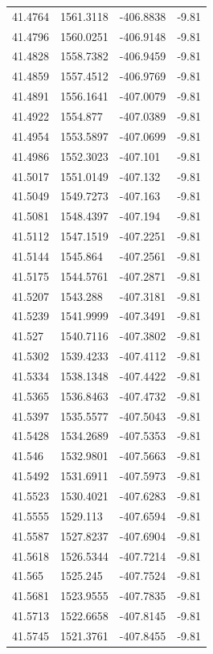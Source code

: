 \begin{table}[H]
\begin{tabular}{llll}
41.4764 & 1561.3118 & -406.8838 & -9.81 \\
41.4796 & 1560.0251 & -406.9148 & -9.81 \\
41.4828 & 1558.7382 & -406.9459 & -9.81 \\
41.4859 & 1557.4512 & -406.9769 & -9.81 \\
41.4891 & 1556.1641 & -407.0079 & -9.81 \\
41.4922 & 1554.877 & -407.0389 & -9.81 \\
41.4954 & 1553.5897 & -407.0699 & -9.81 \\
41.4986 & 1552.3023 & -407.101 & -9.81 \\
41.5017 & 1551.0149 & -407.132 & -9.81 \\
41.5049 & 1549.7273 & -407.163 & -9.81 \\
41.5081 & 1548.4397 & -407.194 & -9.81 \\
41.5112 & 1547.1519 & -407.2251 & -9.81 \\
41.5144 & 1545.864 & -407.2561 & -9.81 \\
41.5175 & 1544.5761 & -407.2871 & -9.81 \\
41.5207 & 1543.288 & -407.3181 & -9.81 \\
41.5239 & 1541.9999 & -407.3491 & -9.81 \\
41.527 & 1540.7116 & -407.3802 & -9.81 \\
41.5302 & 1539.4233 & -407.4112 & -9.81 \\
41.5334 & 1538.1348 & -407.4422 & -9.81 \\
41.5365 & 1536.8463 & -407.4732 & -9.81 \\
41.5397 & 1535.5577 & -407.5043 & -9.81 \\
41.5428 & 1534.2689 & -407.5353 & -9.81 \\
41.546 & 1532.9801 & -407.5663 & -9.81 \\
41.5492 & 1531.6911 & -407.5973 & -9.81 \\
41.5523 & 1530.4021 & -407.6283 & -9.81 \\
41.5555 & 1529.113 & -407.6594 & -9.81 \\
41.5587 & 1527.8237 & -407.6904 & -9.81 \\
41.5618 & 1526.5344 & -407.7214 & -9.81 \\
41.565 & 1525.245 & -407.7524 & -9.81 \\
41.5681 & 1523.9555 & -407.7835 & -9.81 \\
41.5713 & 1522.6658 & -407.8145 & -9.81 \\
41.5745 & 1521.3761 & -407.8455 & -9.81 \\

\end{tabular}
\end{table}
